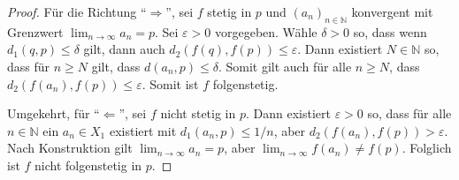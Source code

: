 \documentclass[../main.tex]{subfiles}
\begin{document}
\begin{proof}
  Für die Richtung ``$\Rightarrow$'',
  sei $f$ stetig in $p$ und ${(a_{n})}_{n \in \mathbb{N}}$
  konvergent mit Grenzwert 
  $\lim_{n \to \infty} a_n = p$.
  Sei $\varepsilon > 0$ vorgegeben.
  Wähle $\delta > 0$ so, dass wenn
  $d_1(q, p) \leq \delta$ gilt,
  dann auch $d_2(f(q), f(p)) \leq \varepsilon$.
  Dann existiert $N \in \mathbb{N}$ so,
  dass für $n \geq N$ gilt, dass
  $d(a_n, p) \leq \delta$.
  Somit gilt auch für alle $n \geq N$,
  dass $d_2(f(a_n), f(p)) \leq \varepsilon$.
  Somit ist $f$ folgenstetig.

  Umgekehrt, für ``$\Leftarrow$'',
  sei $f$ nicht stetig in $p$.
  Dann existiert $\varepsilon > 0$ so,
  dass für alle $n \in \mathbb{N}$ ein
  $a_n \in X_1$ existiert mit
  $d_1(a_n, p) \leq 1/n$, aber
  $d_2(f(a_n), f(p)) > \varepsilon$.
  Nach Konstruktion gilt
  $\lim_{n \to \infty}a_n = p$,
  aber $\lim_{n \to \infty}f(a_n) \neq f(p)$.
  Folglich ist $f$ nicht folgenstetig in $p$.
\end{proof}
\end{document}

